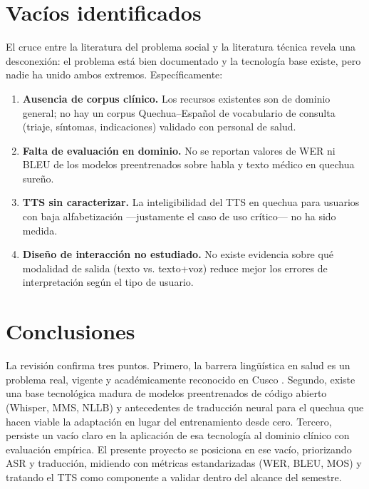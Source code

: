 \documentclass[12pt,a4paper]{article}
\begin{document}
\section{Vac{\'i}os identificados}
El cruce entre la literatura del problema social \parencite{begazo2026,cuaila2022} y la
literatura t{\'e}cnica \parencite{radford2023whisper,pratap2024mms,mager2021americasnlp}
revela una desconexi{\'o}n: el problema est{\'a} bien documentado y la tecnolog{\'i}a base
existe, pero nadie ha unido ambos extremos. Espec{\'i}ficamente:
\begin{enumerate}
  \item \textbf{Ausencia de corpus cl{\'i}nico.} Los recursos existentes
        \parencite{zevallos2022huqariq} son de dominio general; no hay un corpus
        Quechua--Espa{\~n}ol de vocabulario de consulta (triaje, s{\'i}ntomas, indicaciones)
        validado con personal de salud.
  \item \textbf{Falta de evaluaci{\'o}n en dominio.} No se reportan valores de WER ni BLEU de
        los modelos preentrenados sobre habla y texto m{\'e}dico en quechua sure{\~n}o.
  \item \textbf{TTS sin caracterizar.} La inteligibilidad del TTS en quechua para usuarios con
        baja alfabetizaci{\'o}n ---justamente el caso de uso cr{\'i}tico--- no ha sido medida.
  \item \textbf{Diseño de interacci{\'o}n no estudiado.} No existe evidencia sobre qu{\'e}
        modalidad de salida (texto vs. texto+voz) reduce mejor los errores de interpretaci{\'o}n
        seg{\'u}n el tipo de usuario.
\end{enumerate}

\section{Conclusiones}
La revisi{\'o}n confirma tres puntos. Primero, la barrera ling{\"u}{\'i}stica en salud es un
problema real, vigente y acad{\'e}micamente reconocido en Cusco
\parencite{begazo2026,essalud2023}. Segundo, existe una base tecnol{\'o}gica madura de modelos
preentrenados de c{\'o}digo abierto (Whisper, MMS, NLLB) y antecedentes de traducci{\'o}n neural
para el quechua \parencite{ortega2020quechua,mager2021americasnlp} que hacen viable la
adaptaci{\'o}n en lugar del entrenamiento desde cero. Tercero, persiste un vac{\'i}o claro en la
aplicaci{\'o}n de esa tecnolog{\'i}a al dominio cl{\'i}nico con evaluaci{\'o}n emp{\'i}rica. El
presente proyecto se posiciona en ese vac{\'i}o, priorizando ASR y traducci{\'o}n, midiendo con
m{\'e}tricas estandarizadas (WER, BLEU, MOS) y tratando el TTS como componente a validar dentro
del alcance del semestre.

\newpage
\printbibliography[title={Referencias}]
\end{document}
